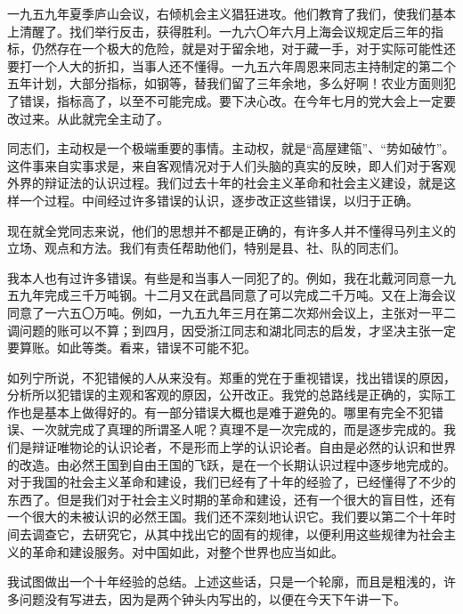 一九五九年夏季庐山会议，右倾机会主义猖狂进攻。他们教育了我们，使我们基本上清醒了。找们举行反击，获得胜利。一九六〇年六月上海会议规定后三年的指标，仍然存在一个极大的危险，就是对于留余地，对于藏一手，对于实际可能性还要打一个人大的折扣，当事人还不懂得。一九五六年周恩来同志主持制定的第二个五年计划，大部分指标，如钢等，替我们留了三年余地，多么好啊！农业方面则犯了错误，指标高了，以至不可能完成。要下决心改。在今年七月的党大会上一定要改过来。从此就完全主动了。

同志们，主动权是一个极端重要的事情。主动权，就是“高屋建瓴”、“势如破竹”。这件事来自实事求是，来自客观情况对于人们头脑的真实的反映，即人们对于客观外界的辩证法的认识过程。我们过去十年的社会主义革命和社会主义建设，就是这样一个过程。中间经过许多错误的认识，逐步改正这些错误，以归于正确。

现在就全党同志来说，他们的思想并不都是正确的，有许多人并不懂得马列主义的立场、观点和方法。我们有责任帮助他们，特别是县、社、队的同志们。

我本人也有过许多错误。有些是和当事人一同犯了的。例如，我在北戴河同意一九五九年完成三千万吨钢。十二月又在武昌同意了可以完成二千万吨。又在上海会议同意了一六五〇万吨。例如，一九五九年三月在第二次郑州会议上，主张对一平二调问题的账可以不算；到四月，因受浙江同志和湖北同志的启发，才坚决主张一定要算账。如此等类。看来，错误不可能不犯。

如列宁所说，不犯错候的人从来没有。郑重的党在于重视错误，找出错误的原因，分析所以犯错误的主观和客观的原因，公开改正。我党的总路线是正确的，实际工作也是基本上做得好的。有一部分错误大概也是难于避免的。哪里有完全不犯错误、一次就完成了真理的所谓圣人呢？真理不是一次完成的，而是逐步完成的。我们是辩证唯物论的认识论者，不是形而上学的认识论者。自由是必然的认识和世界的改造。由必然王国到自由王国的飞跃，是在一个长期认识过程中逐步地完成的。对于我国的社会主义革命和建设，我们已经有了十年的经验了，已经懂得了不少的东西了。但是我们对于社会主义时期的革命和建设，还有一个很大的盲目性，还有一个很大的未被认识的必然王国。我们还不深刻地认识它。我们要以第二个十年时间去调查它，去研究它，从其中找出它的固有的规律，以便利用这些规律为社会主义的革命和建设服务。对中国如此，对整个世界也应当如此。

我试图做出一个十年经验的总结。上述这些话，只是一个轮廓，而且是粗浅的，许多问题没有写进去，因为是两个钟头内写出的，以便在今天下午讲一下。

